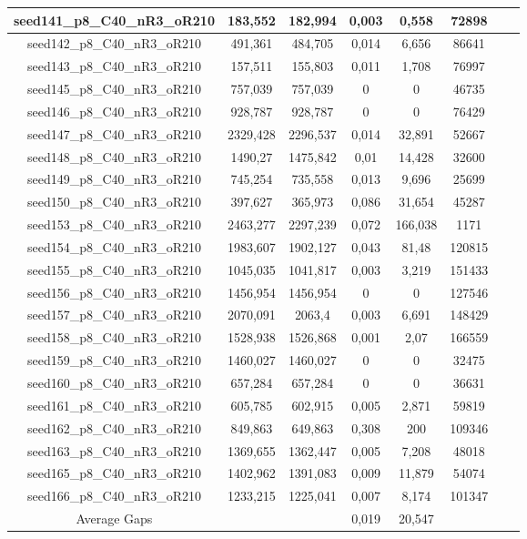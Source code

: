 \documentclass[a4paper]{article}
\begin{document}
\begin{center}
\begin{longtable}{cccccccc}
\hline
seed141\_p8\_C40\_nR3\_oR210 & 183,552 & 182,994 & 0,003 & 0,558 & 72898\\
\hline
seed142\_p8\_C40\_nR3\_oR210 & 491,361 & 484,705 & 0,014 & 6,656 & 86641\\
\hline
seed143\_p8\_C40\_nR3\_oR210 & 157,511 & 155,803 & 0,011 & 1,708 & 76997\\
\hline
seed145\_p8\_C40\_nR3\_oR210 & 757,039 & 757,039 & 0 & 0 & 46735\\
\hline
seed146\_p8\_C40\_nR3\_oR210 & 928,787 & 928,787 & 0 & 0 & 76429\\
\hline
seed147\_p8\_C40\_nR3\_oR210 & 2329,428 & 2296,537 & 0,014 & 32,891 & 52667\\
\hline
seed148\_p8\_C40\_nR3\_oR210 & 1490,27 & 1475,842 & 0,01 & 14,428 & 32600\\
\hline
seed149\_p8\_C40\_nR3\_oR210 & 745,254 & 735,558 & 0,013 & 9,696 & 25699\\
\hline
seed150\_p8\_C40\_nR3\_oR210 & 397,627 & 365,973 & 0,086 & 31,654 & 45287\\
\hline
seed153\_p8\_C40\_nR3\_oR210 & 2463,277 & 2297,239 & 0,072 & 166,038 & 1171\\
\hline
seed154\_p8\_C40\_nR3\_oR210 & 1983,607 & 1902,127 & 0,043 & 81,48 & 120815\\
\hline
seed155\_p8\_C40\_nR3\_oR210 & 1045,035 & 1041,817 & 0,003 & 3,219 & 151433\\
\hline
seed156\_p8\_C40\_nR3\_oR210 & 1456,954 & 1456,954 & 0 & 0 & 127546\\
\hline
seed157\_p8\_C40\_nR3\_oR210 & 2070,091 & 2063,4 & 0,003 & 6,691 & 148429\\
\hline
seed158\_p8\_C40\_nR3\_oR210 & 1528,938 & 1526,868 & 0,001 & 2,07 & 166559\\
\hline
seed159\_p8\_C40\_nR3\_oR210 & 1460,027 & 1460,027 & 0 & 0 & 32475\\
\hline
seed160\_p8\_C40\_nR3\_oR210 & 657,284 & 657,284 & 0 & 0 & 36631\\
\hline
seed161\_p8\_C40\_nR3\_oR210 & 605,785 & 602,915 & 0,005 & 2,871 & 59819\\
\hline
seed162\_p8\_C40\_nR3\_oR210 & 849,863 & 649,863 & 0,308 & 200 & 109346\\
\hline
seed163\_p8\_C40\_nR3\_oR210 & 1369,655 & 1362,447 & 0,005 & 7,208 & 48018\\
\hline
seed165\_p8\_C40\_nR3\_oR210 & 1402,962 & 1391,083 & 0,009 & 11,879 & 54074\\
\hline
seed166\_p8\_C40\_nR3\_oR210 & 1233,215 & 1225,041 & 0,007 & 8,174 & 101347\\
\hline
\hline
Average Gaps & & & 0,019 & 20,547 &  \\
\hline
\hline
\end{longtable}
\end{center}
\end{document}
